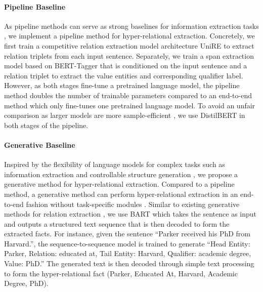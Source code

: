 \documentclass[11pt]{article}
\begin{document}
\paragraph{Pipeline Baseline}
As pipeline methods can serve as strong baselines for information extraction tasks \citep{zhong-chen-2021-frustratingly}, we implement a pipeline method for hyper-relational extraction.
Concretely, we first train a competitive relation extraction model architecture UniRE \citep{wang-etal-2021-unire} to extract relation triplets from each input sentence.
Separately, we train a span extraction model based on BERT-Tagger \citep{devlin-etal-2019-bert} that is conditioned on the input sentence and a relation triplet to extract the value entities and corresponding qualifier label.
However, as both stages fine-tune a pretrained language model, the pipeline method doubles the number of trainable parameters compared to an end-to-end method which only fine-tunes one pretrained language model.
To avoid an unfair comparison as larger models are more sample-efficient \citep{DBLP:journals/corr/abs-2001-08361}, we use DistilBERT \citep{DBLP:journals/corr/abs-1910-01108} in both stages of the pipeline.

\paragraph{Generative Baseline}
Inspired by the flexibility of language models for complex tasks such as information extraction and controllable structure generation \citep{shen-etal-2022-mred}, we propose a generative method for hyper-relational extraction. 
Compared to a pipeline method, a generative method can perform hyper-relational extraction in an end-to-end fashion without task-specific modules \citep{paolini2021structured}.
Similar to existing generative methods for relation extraction \citep{huguet-cabot-navigli-2021-rebel-relation, chia-etal-2022-relationprompt}, we use BART \citep{lewis-etal-2020-bart} which takes the sentence as input and outputs a structured text sequence that is then decoded to form the extracted facts.
For instance, given the sentence ``Parker received his PhD from Harvard.'', the sequence-to-sequence model is trained to generate ``Head Entity: Parker, Relation: educated at, Tail Entity: Harvard, Qualifier: academic degree, Value: PhD.''
The generated text is then decoded through simple text processing to form the hyper-relational fact (Parker, Educated At, Harvard, Academic Degree, PhD). 
\end{document}

